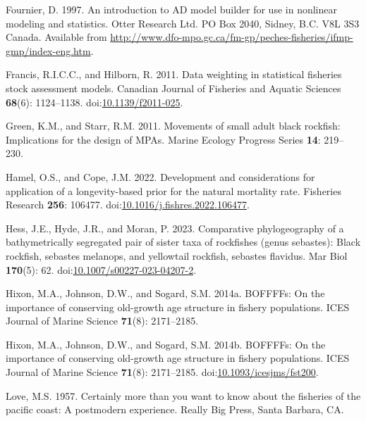 \documentclass[11pt,
  english,
  letterpaper,
]{article}
\newlength{\cslhangindent}
\newenvironment{CSLReferences}[2] %
 {%
  \setlength{\parindent}{0pt}
  \ifodd #1 \everypar{\setlength{\hangindent}{\cslhangindent}}\ignorespaces\fi
  \ifnum #2 > 0
  \setlength{\parskip}{#2\baselineskip}
  \fi
 }%
 {}
\begin{document}
\begin{CSLReferences}{1}{0}
\leavevmode{}%
Fournier, D. 1997. An introduction to AD model builder for use in nonlinear modeling and statistics. Otter Research Ltd. PO Box 2040, Sidney, B.C. V8L 3S3 Canada. Available from \url{http://www.dfo-mpo.gc.ca/fm-gp/peches-fisheries/ifmp-gmp/index-eng.htm}.

\leavevmode{}%
Francis, R.I.C.C., and Hilborn, R. 2011. Data weighting in statistical fisheries stock assessment models. Canadian Journal of Fisheries and Aquatic Sciences \textbf{68}(6): 1124--1138. doi:\href{https://doi.org/10.1139/f2011-025}{10.1139/f2011-025}.

\leavevmode{}%
Green, K.M., and Starr, R.M. 2011. Movements of small adult black rockfish: Implications for the design of MPAs. Marine Ecology Progress Series \textbf{14}: 219--230.

\leavevmode{}%
Hamel, O.S., and Cope, J.M. 2022. Development and considerations for application of a longevity-based prior for the natural mortality rate. Fisheries Research \textbf{256}: 106477. doi:\href{https://doi.org/10.1016/j.fishres.2022.106477}{10.1016/j.fishres.2022.106477}.

\leavevmode{}%
Hess, J.E., Hyde, J.R., and Moran, P. 2023. Comparative phylogeography of a bathymetrically segregated pair of sister taxa of rockfishes (genus sebastes): Black rockfish, sebastes melanops, and yellowtail rockfish, sebastes flavidus. Mar Biol \textbf{170}(5): 62. doi:\href{https://doi.org/10.1007/s00227-023-04207-2}{10.1007/s00227-023-04207-2}.

\leavevmode{}%
Hixon, M.A., Johnson, D.W., and Sogard, S.M. 2014a. BOFFFFs: On the importance of conserving old-growth age structure in fishery populations. ICES Journal of Marine Science \textbf{71}(8): 2171--2185.

\leavevmode{}%
Hixon, M.A., Johnson, D.W., and Sogard, S.M. 2014b. {BOFFFFs}: On the importance of conserving old-growth age structure in fishery populations. {ICES} Journal of Marine Science \textbf{71}(8): 2171--2185. doi:\href{https://doi.org/10.1093/icesjms/fst200}{10.1093/icesjms/fst200}.

\leavevmode{}%
Love, M.S. 1957. Certainly more than you want to know about the fisheries of the pacific coast: A postmodern experience. Really Big Press, Santa Barbara, CA.


\end{CSLReferences}
\end{document}
